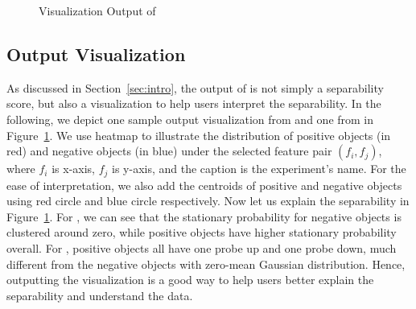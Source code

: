 


\begin{figure}[h]
\centering     %
\vspace{-3mm}
\vspace{-5mm}
\caption{Visualization Output of \genviz}
\vspace{-5mm}
\label{fig:viz}
\end{figure}

\subsection{Output Visualization}
As discussed in Section~\ref{sec:intro}, the output of \genviz is not simply a separability score, but also a visualization to help users interpret the separability. 
In the following, we depict one sample output visualization from \msig and one from \lincs in Figure~\ref{fig:viz}. We use heatmap to illustrate the distribution of positive objects (in red) and negative objects (in blue) under the selected feature pair $(f_i,f_j)$, where $f_i$ is x-axis, $f_j$ is y-axis, and the caption is the experiment's name. For the ease of interpretation, we also add the centroids of positive and negative objects using red circle and blue circle respectively.
Now let us explain the separability in Figure~\ref{fig:viz}. For \msig, we can see that the stationary probability for negative objects is clustered around zero, while positive objects have higher stationary probability overall. For \lincs, positive objects all have one probe up and one probe down, much different from the negative objects with zero-mean Gaussian distribution.
Hence, outputting the visualization is a good way to help users better explain the separability and understand the data. 





